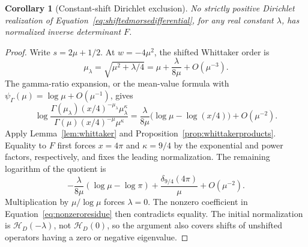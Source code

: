 \documentclass[11pt,letterpaper]{article}
\numberwithin{equation}{section}
\newtheorem{corollary}[theorem]{Corollary}
\theoremstyle{definition}
\theoremstyle{remark}
\begin{document}
\begin{corollary}[Constant-shift Dirichlet exclusion]
\label{cor:shiftedmorseexclusion}
No strictly positive Dirichlet realization of Equation~\eqref{eq:shiftedmorsedifferential}, for any real constant $\lambda$, has normalized inverse determinant $F$.
\end{corollary}
\begin{proof}
Write $s=2\mu+1/2$. At $w=-4\mu^2$, the shifted Whittaker order is
\begin{equation}
 \mu_\lambda=\sqrt{\mu^2+\lambda/4}
 =\mu+\frac{\lambda}{8\mu}+O(\mu^{-3}).
 \label{eq:shiftedorder}
\end{equation}
The gamma-ratio expansion, or the mean-value formula with
$\psi_\Gamma(\mu)=\log\mu+O(\mu^{-1})$, gives
\begin{equation}
 \log\frac{\Gamma(\mu_\lambda)(x/4)^{-\mu_\lambda}
                         \mu_\lambda^\kappa}
                    {\Gamma(\mu)(x/4)^{-\mu}\mu^\kappa}
 =\frac{\lambda}{8\mu}\bigl(\log\mu-\log(x/4)\bigr)
   +O(\mu^{-2}).
 \label{eq:shiftlogterm}
\end{equation}
Apply Lemma~\ref{lem:whittaker} and Proposition~\ref{prop:whittakerproducts}. Equality to $F$ first forces $x=4\pi$ and $\kappa=9/4$ by the exponential and power factors, respectively, and fixes the leading normalization. The remaining logarithm of the quotient is
\begin{equation}
 -\frac{\lambda}{8\mu}(\log\mu-\log\pi)
       +\frac{\delta_{9/4}(4\pi)}{\mu}+O(\mu^{-2}).
 \label{eq:shiftedmorsecontradiction}
\end{equation}
Multiplication by $\mu/\log\mu$ forces $\lambda=0$. The nonzero coefficient in Equation~\eqref{eq:nonzeroresidue} then contradicts equality. The initial normalization is $\mathcal H_D(-\lambda)$, not $\mathcal H_D(0)$, so the argument also covers shifts of unshifted operators having a zero or negative eigenvalue.
\end{proof}
\end{document}
